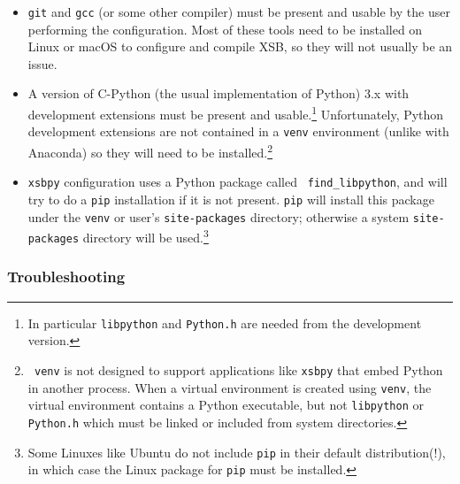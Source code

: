 \begin{itemize}
\item {\tt git} and {\tt gcc} (or some other compiler) must be present
  and usable by the user performing the configuration.  Most of these
  tools need to be installed on Linux or macOS to configure and
  compile XSB, so they will not usually be an issue.

\item A version of C-Python (the usual implementation of Python) 3.x
  with development extensions must be present and usable.\footnote{In
    particular {\tt libpython} and {\tt Python.h} are needed from the
    development version.}  Unfortunately, Python development
  extensions are not contained in a {\tt venv} environment (unlike
  with Anaconda) so they will need to be installed.\footnote{{\tt
      venv} is not designed to support applications like {\tt xsbpy}
    that embed Python in another process.  When a virtual environment
    is created using {\tt venv}, the virtual environment contains a
    Python executable, but not {\tt libpython} or {\tt Python.h} which
    must be linked or included from system directories.}

  \item {\tt xsbpy} configuration uses a Python package called {\tt
    find\_libpython}, and will try to do a {\tt pip} installation if
    it is not present.  {\tt pip} will install this package under the
    {\tt venv} or user's {\tt site-packages} directory; otherwise a
    system {\tt site-packages} directory will be used.\footnote{Some
      Linuxes like Ubuntu do not include {\tt pip} in their default
      distribution(!), in which case the Linux package for {\tt pip} must
      be installed.}
\end{itemize}



\subsubsection{Troubleshooting}

%  

